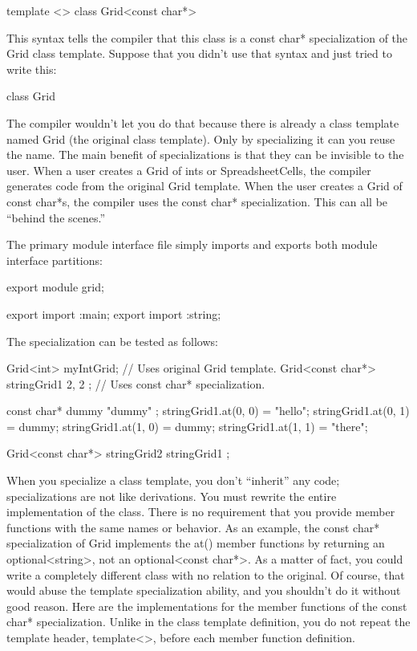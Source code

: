 \begin{cpp}
template <>
class Grid<const char*>
\end{cpp}

This syntax tells the compiler that this class is a const char* specialization of the Grid class template. Suppose that you didn’t use that syntax and just tried to write this:

\begin{cpp}
class Grid
\end{cpp}

The compiler wouldn’t let you do that because there is already a class template named Grid (the original class template). Only by specializing it can you reuse the name. The main benefit of specializations is that they can be invisible to the user. When a user creates a Grid of ints or SpreadsheetCells, the compiler generates code from the original Grid template. When the user creates a Grid of const char*s, the compiler uses the const char* specialization. This can all be “behind the scenes.”

The primary module interface file simply imports and exports both module interface partitions:

\begin{cpp}
export module grid;

export import :main;
export import :string;
\end{cpp}

The specialization can be tested as follows:

\begin{cpp}
Grid<int> myIntGrid; // Uses original Grid template.
Grid<const char*> stringGrid1 { 2, 2 }; // Uses const char* specialization.

const char* dummy { "dummy" };
stringGrid1.at(0, 0) = "hello";
stringGrid1.at(0, 1) = dummy;
stringGrid1.at(1, 0) = dummy;
stringGrid1.at(1, 1) = "there";

Grid<const char*> stringGrid2 { stringGrid1 };
\end{cpp}

When you specialize a class template, you don’t “inherit” any code; specializations are not like derivations. You must rewrite the entire implementation of the class. There is no requirement that you provide member functions with the same names or behavior. As an example, the const char* specialization of Grid implements the at() member functions by returning an optional<string>, not an optional<const char*>. As a matter of fact, you could write a completely different class with no relation to the original. Of course, that would abuse the template specialization ability, and you shouldn’t do it without good reason. Here are the implementations for the member functions of the const char* specialization. Unlike in the class template definition, you do not repeat the template header, template<>, before each member function definition.

